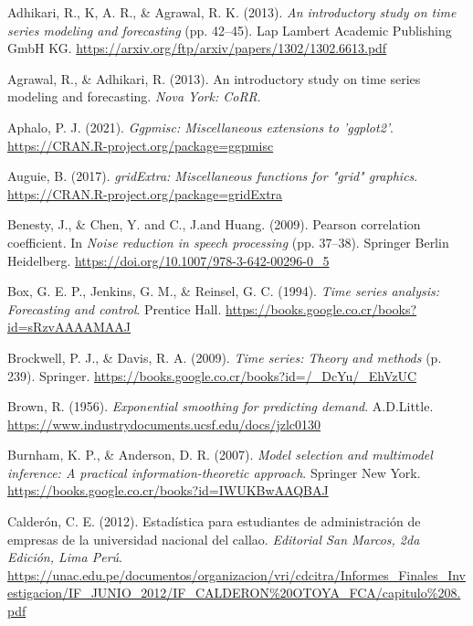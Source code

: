 \documentclass[
]{article}
\newlength{\cslhangindent}
\newlength{\cslentryspacingunit} %
\newenvironment{CSLReferences}[2] %
 {%
  \setlength{\parindent}{0pt}
  \ifodd #1
  \let\oldpar\par
  \def\par{\hangindent=\cslhangindent\oldpar}
  \fi
  \setlength{\parskip}{#2\cslentryspacingunit}
 }%
 {}
\begin{document}
\hypertarget{refs}{}
\begin{CSLReferences}{1}{0}
\leavevmode{}%
Adhikari, R., K, A. R., \& Agrawal, R. K. (2013). \emph{An introductory
study on time series modeling and forecasting} (pp. 42--45). Lap Lambert
Academic Publishing GmbH KG.
\url{https://arxiv.org/ftp/arxiv/papers/1302/1302.6613.pdf}

\leavevmode{}%
Agrawal, R., \& Adhikari, R. (2013). An introductory study on time
series modeling and forecasting. \emph{Nova York: CoRR}.

\leavevmode{}%
Aphalo, P. J. (2021). \emph{Ggpmisc: Miscellaneous extensions to
'ggplot2'}. \url{https://CRAN.R-project.org/package=ggpmisc}

\leavevmode{}%
Auguie, B. (2017). \emph{gridExtra: Miscellaneous functions for "grid"
graphics}. \url{https://CRAN.R-project.org/package=gridExtra}

\leavevmode{}%
Benesty, J., \& Chen, Y. and C., J.and Huang. (2009). Pearson
correlation coefficient. In \emph{Noise reduction in speech processing}
(pp. 37--38). Springer Berlin Heidelberg.
\url{https://doi.org/10.1007/978-3-642-00296-0_5}

\leavevmode{}%
Box, G. E. P., Jenkins, G. M., \& Reinsel, G. C. (1994). \emph{Time
series analysis: Forecasting and control}. Prentice Hall.
\url{https://books.google.co.cr/books?id=sRzvAAAAMAAJ}

\leavevmode{}%
Brockwell, P. J., \& Davis, R. A. (2009). \emph{Time series: Theory and
methods} (p. 239). Springer.
\url{https://books.google.co.cr/books?id=/_DcYu/_EhVzUC}

\leavevmode{}%
Brown, R. (1956). \emph{Exponential smoothing for predicting demand}.
A.D.Little. \url{https://www.industrydocuments.ucsf.edu/docs/jzlc0130}

\leavevmode{}%
Burnham, K. P., \& Anderson, D. R. (2007). \emph{Model selection and
multimodel inference: A practical information-theoretic approach}.
Springer New York.
\url{https://books.google.co.cr/books?id=IWUKBwAAQBAJ}

\leavevmode{}%
Calderón, C. E. (2012). Estadística para estudiantes de administración
de empresas de la universidad nacional del callao. \emph{Editorial San
Marcos, 2da Edición, Lima Perú}.
\url{https://unac.edu.pe/documentos/organizacion/vri/cdcitra/Informes_Finales_Investigacion/IF_JUNIO_2012/IF_CALDERON\%20OTOYA_FCA/capitulo\%208.pdf}


\end{CSLReferences}
\end{document}
